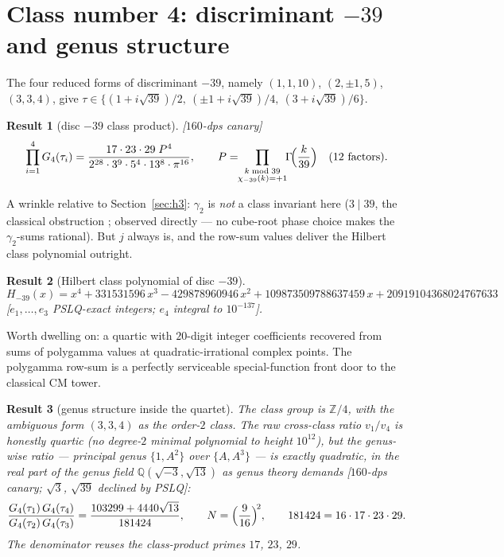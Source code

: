 \documentclass[11pt]{article}
\newtheorem{result}{Result}[section]
\theoremstyle{remark}
\newcommand{\dps}[1]{\textsf{\footnotesize[#1]}}
\begin{document}
\section{Class number 4: discriminant \texorpdfstring{$-39$}{-39} and genus structure}
\label{sec:h4}

The four reduced forms of discriminant $-39$, namely $(1,1,10)$, $(2,\pm1,5)$, $(3,3,4)$,
give $\tau\in\{(1+i\sqrt{39})/2,\ (\pm1+i\sqrt{39})/4,\ (3+i\sqrt{39})/6\}$.

\begin{result}[disc $-39$ class product]\label{res:d39}
\dps{$160$-dps canary}
\[
\prod_{i=1}^{4}G_4(\tau_i)
=\frac{17\cdot23\cdot29\;P^4}{2^{28}\cdot3^{9}\cdot5^{4}\cdot13^{8}\cdot\pi^{16}},\qquad
P=\!\!\prod_{\substack{k\bmod 39\\ \chi_{-39}(k)=+1}}\!\!\Gamma\!\Bigl(\frac{k}{39}\Bigr)
\quad\text{(12 factors)}.
\]
\end{result}

A wrinkle relative to Section~\ref{sec:h3}: $\gamma_2$ is \emph{not} a class invariant here
($3\mid 39$, the classical obstruction \cite{Cox}; observed directly --- no cube-root phase choice makes
the $\gamma_2$-sums rational). But $j$ always is, and the row-sum values deliver the Hilbert
class polynomial outright.

\begin{result}[Hilbert class polynomial of disc $-39$]\label{res:H39}
\[
H_{-39}(x)=x^4+331531596\,x^3-429878960946\,x^2+109873509788637459\,x
+20919104368024767633
\]
\dps{$e_1,\dots,e_3$ PSLQ-exact integers; $e_4$ integral to $10^{-137}$}.
\end{result}

Worth dwelling on: a quartic with $20$-digit integer coefficients recovered from sums of
polygamma values at quadratic-irrational complex points. The polygamma row-sum is a
perfectly serviceable special-function front door to the classical CM tower.

\begin{result}[genus structure inside the quartet]\label{res:genus}
The class group is $\mathbb{Z}/4$, with the ambiguous form $(3,3,4)$ as the order-$2$ class.
The raw cross-class ratio $v_1/v_4$ is honestly \emph{quartic} (no degree-$2$ minimal
polynomial to height $10^{12}$), but the genus-wise ratio --- principal genus $\{1,A^2\}$
over $\{A,A^3\}$ --- is exactly quadratic, in the real part of the genus field
$\mathbb{Q}(\sqrt{-3},\sqrt{13})$ as genus theory demands
\dps{$160$-dps canary; $\sqrt3$, $\sqrt{39}$ declined by PSLQ}:
\[
\frac{G_4(\tau_1)\,G_4(\tau_4)}{G_4(\tau_2)\,G_4(\tau_3)}
=\frac{103299+4440\sqrt{13}}{181424},\qquad
N=\Bigl(\frac{9}{16}\Bigr)^{\!2},\qquad 181424=16\cdot17\cdot23\cdot29 .
\]
The denominator reuses the class-product primes $17$, $23$, $29$.
\end{result}
\end{document}
